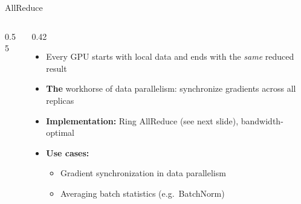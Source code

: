 \begin{frame}{AllReduce}
\begin{columns}
\begin{column}{0.55\textwidth}
\begin{center}
      \end{center}
    \end{column}
    \begin{column}{0.42\textwidth}
      \begin{itemize}
        \item Every GPU starts with local data and ends with the \emph{same} reduced result
        \item \textbf{The} workhorse of data parallelism: synchronize gradients across all replicas
        \item \textbf{Implementation:} Ring AllReduce (see next slide), bandwidth-optimal
        \item \textbf{Use cases:}
          \begin{itemize}
            \item Gradient synchronization in data parallelism
            \item Averaging batch statistics (e.g.\ BatchNorm)
          \end{itemize}
      \end{itemize}
    \end{column}
  \end{columns}
\end{frame}

